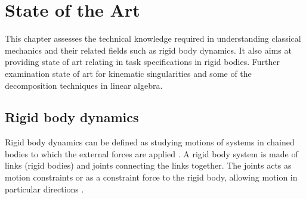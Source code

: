 
\chapter{State of the Art}
\label{SOA}
This chapter assesses the technical knowledge required in understanding classical mechanics and their related fields such as rigid body dynamics. It also aims at providing state of art relating in task specifications in rigid bodies. Further examination state of art for kinematic singularities and some of the decomposition techniques in linear algebra.
\section{Rigid body dynamics}
Rigid body dynamics can be defined as studying motions of systems in chained bodies to which the external forces are applied \cite{paul1979kinematics}. A rigid body system is made of links (rigid bodies) and joints connecting the links together. 
The joints acts as motion constraints or as a constraint force to the rigid body, allowing motion in particular directions \cite{featherstone2014rigid}.


